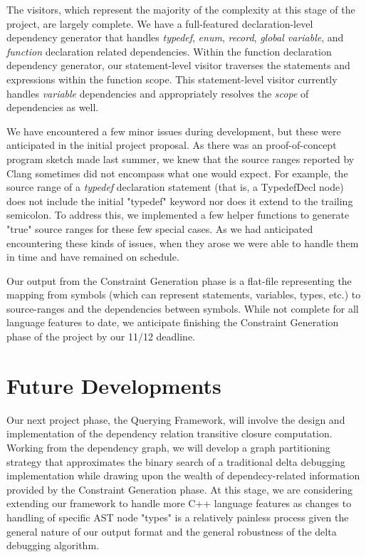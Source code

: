 \documentclass[11pt]{article}
\begin{document}
The visitors, which represent the majority of the complexity at this stage of the project, are largely complete. We have a full-featured declaration-level dependency generator that handles \emph{typedef}, \emph{enum}, \emph{record}, \emph{global variable}, and \emph{function} declaration related dependencies. Within the function declaration dependency generator, our statement-level visitor traverses the statements and expressions within the function scope. This statement-level visitor currently handles \emph{variable} dependencies and appropriately resolves the \emph{scope} of dependencies as well.

We have encountered a few minor issues during development, but these were anticipated in the initial project proposal. As there was an proof-of-concept program sketch made last summer, we knew that the source ranges reported by Clang sometimes did not encompass what one would expect. For example, the source range of a \emph{typedef} declaration statement (that is, a TypedefDecl node) does not include the initial "typedef" keyword nor does it extend to the trailing semicolon. To address this, we implemented a few helper functions to generate "true" source ranges for these few special cases. As we had anticipated encountering these kinds of issues, when they arose we were able to handle them in time and have remained on schedule.

Our output from the Constraint Generation phase is a flat-file representing the mapping from symbols (which can represent statements, variables, types, etc.) to source-ranges and the dependencies between symbols. While not complete for all language features to date, we anticipate finishing the Constraint Generation phase of the project by our 11/12 deadline.

\section{Future Developments}
Our next project phase, the Querying Framework, will involve the design and implementation of the dependency relation transitive closure computation. Working from the dependency graph, we will develop a graph partitioning strategy that approximates the binary search of a traditional delta debugging implementation while drawing upon the wealth of dependecy-related information provided by the Constraint Generation phase. At this stage, we are considering extending our framework to handle more C++ language features as changes to handling of specific AST node "types" is a relatively painless process given the general nature of our output format and the general robustness of the delta debugging algorithm.

\end{document}

